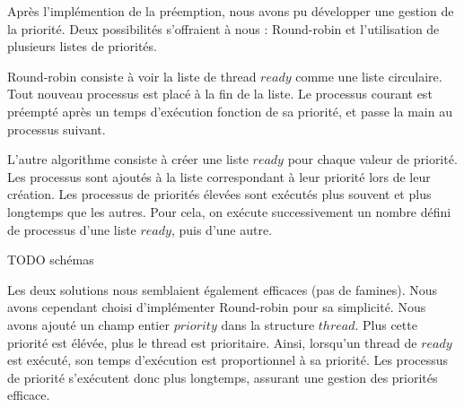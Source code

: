 Après l'implémention de la préemption, nous avons pu développer une gestion de la priorité. Deux possibilités s'offraient à nous : Round-robin et l'utilisation de plusieurs listes de priorités.

Round-robin consiste à voir la liste de thread $ready$ comme une liste circulaire. Tout nouveau processus est placé à la fin de la liste. Le processus courant est préempté après un temps d'exécution fonction de sa priorité, et passe la main au processus suivant.

L'autre algorithme consiste à créer une liste $ready$ pour chaque valeur de priorité. Les processus sont ajoutés à la liste correspondant à leur priorité lors de leur création. Les processus de priorités élevées sont exécutés plus souvent et plus longtemps que les autres. Pour cela, on exécute successivement un nombre défini de processus d'une liste $ready$, puis d'une autre.

TODO   schémas

Les deux solutions nous semblaient également efficaces (pas de famines). Nous avons cependant choisi d'implémenter Round-robin pour sa simplicité. Nous avons ajouté un champ entier $priority$ dans la structure $thread$. Plus cette priorité est élévée, plus le thread est prioritaire. Ainsi, lorsqu'un thread de $ready$ est exécuté, son temps d'exécution est proportionnel à sa priorité. Les processus de priorité s'exécutent donc plus longtemps, assurant une gestion des priorités efficace.